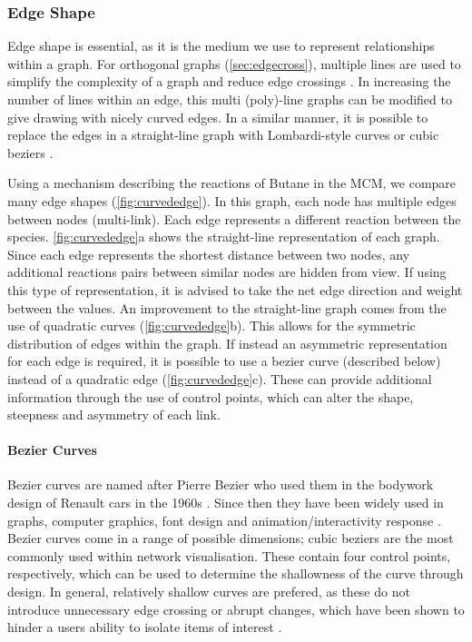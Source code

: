 \subsubsection{Edge Shape}
Edge shape is essential, as it is the medium we use to represent relationships within a graph. For orthogonal graphs (\autoref{sec:edgecross}), multiple lines are used to simplify the complexity of a graph and reduce edge crossings \citep{ortho}. In increasing the number of lines within an edge, this multi (poly)-line graphs can be modified to give drawing with nicely curved edges. In a similar manner, it is possible to replace the edges in a straight-line graph with Lombardi-style curves or cubic beziers \citep{lombardi,bezier}.

Using a mechanism describing the reactions of Butane in the MCM, we compare many edge shapes (\autoref{fig:curvededge}). In this graph, each node has multiple edges between nodes (multi-link). Each edge represents a different reaction between the species. \autoref{fig:curvededge}a shows the straight-line representation of each graph. Since each edge represents the shortest distance between two nodes, any additional reactions pairs between similar nodes are hidden from view. If using this type of representation, it is advised to take the net edge direction and weight between the values. An improvement to the straight-line graph comes from the use of quadratic curves (\autoref{fig:curvededge}b). This allows for the symmetric distribution of edges within the graph. If instead an asymmetric representation for each edge is required, it is possible to use a bezier curve (described below) instead of a quadratic edge (\autoref{fig:curvededge}c). These can provide additional information through the use of control points, which can alter the shape, steepness and asymmetry of each link.

\paragraph*{Bezier Curves}
Bezier curves are named after Pierre Bezier who used them in the bodywork design of Renault cars in the 1960s \citep{beziermath}. Since then they have been widely used in graphs, computer graphics, font design and animation/interactivity response \citep{bezier,beziermath,beziercomputer}. Bezier curves come in a range of possible dimensions; cubic beziers are the most commonly used within network visualisation. These contain four control points, respectively, which can be used to determine the shallowness of the curve through design. In general, relatively shallow curves are prefered, as these do not introduce unnecessary edge crossing or abrupt changes, which have been shown to hinder a users ability to isolate items of interest \citep{ch6graphredability}.


